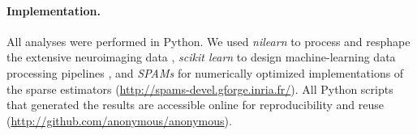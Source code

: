 \documentclass{article}
\DeclareMathOperator*{\argmin}{arg\,min}
\begin{document}


\paragraph{Implementation.}
All analyses were performed in Python.
We used \textit{nilearn} to process and resphape
the extensive neuroimaging data 
\cite{abrah14},
\textit{scikit learn} to design machine-learning
data processing pipelines
\cite{pedr11},
and
\textit{SPAMs} for numerically optimized
implementations of the sparse estimators
(\url{http://spams-devel.gforge.inria.fr/}).
All Python scripts that generated the results are
accessible online for reproducibility and reuse
(\url{http://github.com/anonymous/anonymous}).
  
\end{document}
